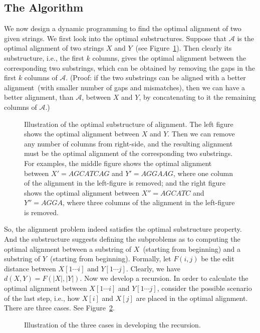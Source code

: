 \subsection*{The Algorithm}

We now design a dynamic programming to find the optimal alignment of two given strings.
We first look into the optimal substructures. Suppose that $\mathcal{A}$ is the optimal
alignment of two strings $X$ and $Y$~(see Figure~\ref{fig:optimal}).
Then clearly its substructure, i.e., the first $k$ columns, gives the optimal
alignment between the corresponding two substrings, which can be obtained by removing
the gaps in the first $k$ columns of $\mathcal{A}$.
(Proof: if the two substrings can be aligned with
a better alignment~(with smaller number of gaps and mismatches), then we can have
a better alignment, than $\mathcal{A}$, between $X$ and $Y$,
by concatenating to it the remaining columns of $\mathcal{A}$.)

\begin{figure}[h]
\centering{}
\caption{Illustration of the optimal substructure of alignment.
The left figure shows the optimal alignment between $X$ and $Y$.
Then we can remove any number of columns from right-side, and the resulting
alignment must be the optimal alignment of the corresponding two substrings.
For examples, the middle figure shows the optimal alignment between $X' = AGCATCAG$ and $Y' = AGGAAG$,
where one column of the alignment in the left-figure is removed;
and the right figure shows the optimal alignment between $X'' = AGCATC$ and $Y'' = AGGA$,
where three columns of the alignment in the left-figure is removed.}
\label{fig:optimal}
\end{figure}

So, the alignment problem indeed satisfies the optimal substructure property.
And the substructure suggests defining the subproblems as to computing the optimal
alignment between a substring of $X$~(starting from beginning) and 
a substring of $Y$~(starting from beginning).
Formally, let $F(i,j)$ be the edit distance between $X[1\cdots i]$ and $Y[1\cdots j]$.
Clearly, we have $d(X, Y) = F(|X|, |Y|)$.
Now we develop a recursion. In order to calculate the optimal alignment between $X[1\cdots i]$
and $Y[1\cdots j]$, consider the possible scenario of the last step, i.e., how $X[i]$ and $X[j]$
are placed in the optimal alignment. There are three cases. See Figure~\ref{fig:recursion}.

\begin{figure}[h]
\centering{}
\caption{Illustration of the three cases in developing the recursion.}
\label{fig:recursion}
\end{figure}



